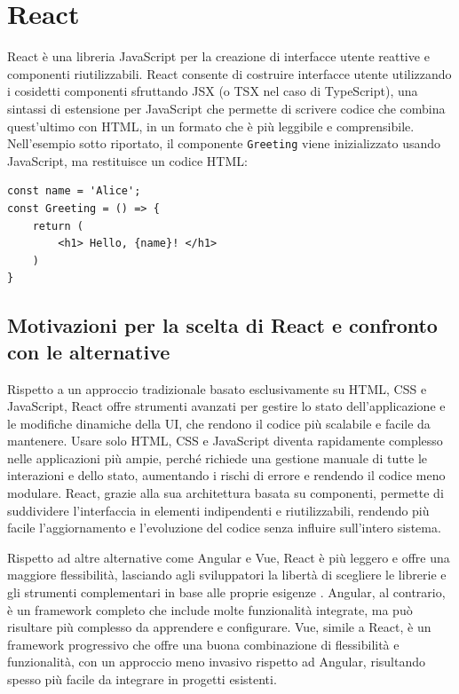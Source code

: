 \documentclass[target=bach,aauheader=,style=]{thud}
\begin{document}
\section{React}
React è una libreria JavaScript per la creazione di interfacce utente reattive e componenti riutilizzabili. React consente di costruire interfacce utente utilizzando i cosidetti componenti sfruttando JSX (o TSX nel caso di TypeScript), una sintassi di estensione per JavaScript che permette di scrivere codice che combina quest'ultimo con HTML, in un formato che è più leggibile e comprensibile. Nell'esempio sotto riportato, il componente \texttt{Greeting} viene inizializzato usando JavaScript, ma restituisce un codice HTML:

\begin{lstlisting}[language=React, caption=Esempio di codice React]
const name = 'Alice';   
const Greeting = () => {
    return (
        <h1> Hello, {name}! </h1>
    )
} 
\end{lstlisting}

\subsection{Motivazioni per la scelta di React e confronto con le alternative}
Rispetto a un approccio tradizionale basato esclusivamente su HTML, CSS e JavaScript, React offre strumenti avanzati per gestire lo stato dell'applicazione e le modifiche dinamiche della UI, che rendono il codice più scalabile e facile da mantenere. Usare solo HTML, CSS e JavaScript diventa rapidamente complesso nelle applicazioni più ampie, perché richiede una gestione manuale di tutte le interazioni e dello stato, aumentando i rischi di errore e rendendo il codice meno modulare. React, grazie alla sua architettura basata su componenti, permette di suddividere l'interfaccia in elementi indipendenti e riutilizzabili, rendendo più facile l'aggiornamento e l'evoluzione del codice senza influire sull'intero sistema. 

\noindent Rispetto ad altre alternative come Angular e Vue, React è più leggero e offre una maggiore flessibilità, lasciando agli sviluppatori la libertà di scegliere le librerie e gli strumenti complementari in base alle proprie esigenze \cite{saks2019javascript}. Angular, al contrario, è un framework completo che include molte funzionalità integrate, ma può risultare più complesso da apprendere e configurare. Vue, simile a React, è un framework progressivo che offre una buona combinazione di flessibilità e funzionalità, con un approccio meno invasivo rispetto ad Angular, risultando spesso più facile da integrare in progetti esistenti.
\end{document}
